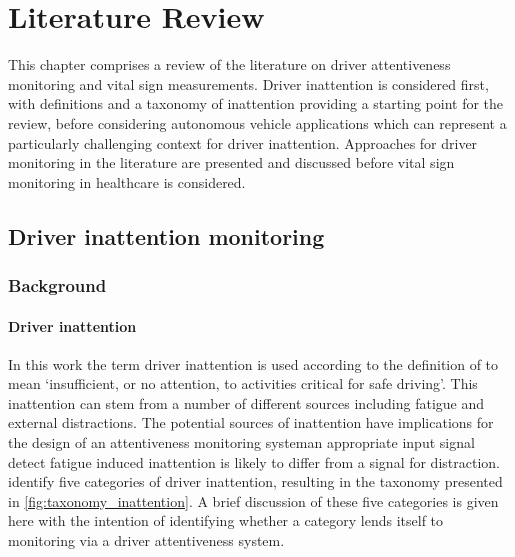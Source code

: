 \documentclass[11pt, parskip=half*,twoside=false]{scrbook}
\begin{document}


\chapter{Literature Review} \label{ch:litreview}
This chapter comprises a review of the literature on driver attentiveness monitoring and vital sign measurements. Driver inattention is considered first, with definitions and a taxonomy of inattention providing a starting point for the review, before considering autonomous vehicle applications which can represent a particularly challenging context for driver inattention. Approaches for driver monitoring in the literature are presented and discussed before vital sign monitoring in healthcare is considered.

\section{Driver inattention monitoring} \label{sec:distraction}
\subsection{Background} \label{ssec:overview}

\subsubsection{Driver inattention}
In this work the term driver inattention is used according to the definition of \citet{reganDriverDistractionDriver2011} to mean `insufficient, or no attention, to activities critical for safe driving'. This inattention can stem from a number of different sources including fatigue and external distractions. The potential sources of inattention have implications for the design of an attentiveness monitoring system\textemdash an appropriate input signal detect fatigue induced inattention is likely to differ from a signal for distraction.  \citet{reganDriverDistractionDriver2011} identify five categories of driver inattention, resulting in the taxonomy presented in \cref{fig:taxonomy_inattention}. A brief discussion of these five categories is given here with the intention of identifying whether a category lends itself to monitoring via a driver attentiveness system. 
\end{document}
